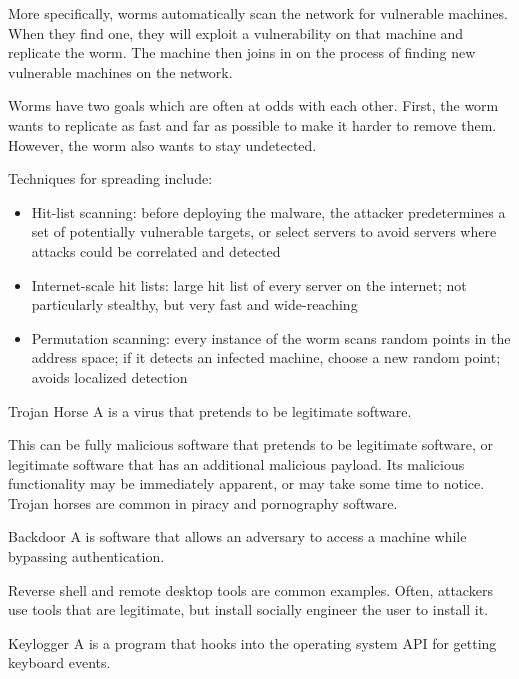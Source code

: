\documentclass[code]{amznotes}
\begin{document}
More specifically, worms automatically scan the network for vulnerable machines. When they find one, they will exploit a vulnerability on that machine and replicate the worm. The machine then joins in on the process of finding new vulnerable machines on the network.

Worms have two goals which are often at odds with each other. First, the worm wants to replicate as fast and far as possible to make it harder to remove them. However, the worm also wants to stay undetected.

Techniques for spreading include:
\begin{itemize}
    \item Hit-list scanning: before deploying the malware, the attacker predetermines a set of potentially vulnerable targets, or select servers to avoid servers where attacks could be correlated and detected
    \item Internet-scale hit lists: large hit list of every server on the internet; not particularly stealthy, but very fast and wide-reaching
    \item Permutation scanning: every instance of the worm scans random points in the address space; if it detects an infected machine, choose a new random point; avoids localized detection
\end{itemize}

\begin{dfnbox}{Trojan Horse}{}
    A  is a virus that pretends to be legitimate software.
\end{dfnbox}

This can be fully malicious software that pretends to be legitimate software, or legitimate software that has an additional malicious payload. Its malicious functionality may be immediately apparent, or may take some time to notice. Trojan horses are common in piracy and pornography software.

\begin{dfnbox}{Backdoor}{}
    A  is software that allows an adversary to access a machine while bypassing authentication.
\end{dfnbox}

Reverse shell and remote desktop tools are common examples. Often, attackers use tools that are legitimate, but install socially engineer the user to install it.

\begin{dfnbox}{Keylogger}{}
    A  is a program that hooks into the operating system API for getting keyboard events.
\end{dfnbox}
\end{document}
